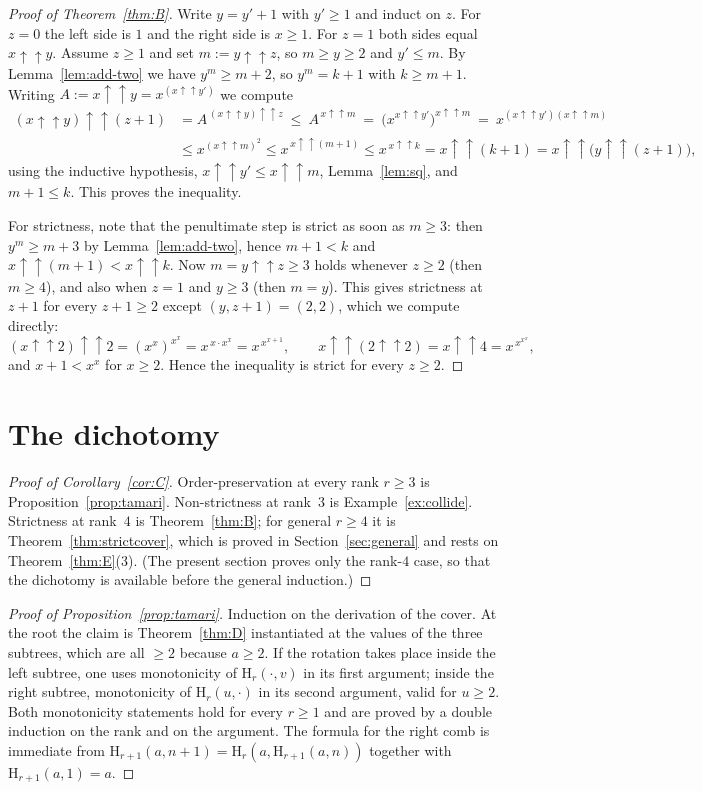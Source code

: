 \documentclass[11pt,a4paper]{article}
\theoremstyle{plain}
\theoremstyle{definition}
\newcommand{\HH}{\mathrm{H}}
\newcommand{\tw}{\uparrow\uparrow}
\begin{document}
\begin{proof}[Proof of Theorem~\ref{thm:B}]
Write $y=y'+1$ with $y'\ge1$ and induct on $z$.
For $z=0$ the left side is $1$ and the right side is $x\ge1$.
For $z=1$ both sides equal $x\tw y$.
Assume $z\ge1$ and set $m:=y\tw z$, so $m\ge y\ge2$ and $y'\le m$.
By Lemma~\ref{lem:add-two} we have $y^{m}\ge m+2$, so $y^{m}=k+1$ with $k\ge m+1$.
Writing $A:=x\tw y=x^{(x\tw y')}$ we compute
\begin{align*}
  (x\tw y)\tw(z+1)
  &= A^{\,(x\tw y)\tw z}
   \ \le\ A^{\,x\tw m}
   \ =\ \bigl(x^{x\tw y'}\bigr)^{x\tw m}
   \ =\ x^{(x\tw y')(x\tw m)}\\
  &\le x^{(x\tw m)^{2}}
   \le x^{\,x\tw(m+1)}
   \le x^{\,x\tw k}
   = x\tw(k+1)
   = x\tw\bigl(y\tw(z+1)\bigr),
\end{align*}
using the inductive hypothesis, $x\tw y'\le x\tw m$, Lemma~\ref{lem:sq}, and
$m+1\le k$. This proves the inequality.

For strictness, note that the penultimate step is strict as soon as $m\ge3$: then
$y^{m}\ge m+3$ by Lemma~\ref{lem:add-two}, hence $m+1<k$ and $x\tw(m+1)<x\tw k$.
Now $m=y\tw z\ge3$ holds whenever $z\ge2$ (then $m\ge4$), and also when $z=1$ and
$y\ge3$ (then $m=y$). This gives strictness at $z+1$ for every $z+1\ge2$ except
$(y,z+1)=(2,2)$, which we compute directly:
\[
  (x\tw2)\tw2=(x^{x})^{x^{x}}=x^{\,x\cdot x^{x}}=x^{\,x^{x+1}},
  \qquad
  x\tw(2\tw2)=x\tw4=x^{\,x^{x^{x}}},
\]
and $x+1<x^{x}$ for $x\ge2$. Hence the inequality is strict for every $z\ge2$.
\end{proof}
\section{The dichotomy}\label{sec:dicho}

\begin{proof}[Proof of Corollary~\ref{cor:C}]
Order-preservation at every rank $r\ge3$ is Proposition~\ref{prop:tamari}.
Non-strictness at rank~$3$ is Example~\ref{ex:collide}. Strictness at rank~$4$ is
Theorem~\ref{thm:B}; for general $r\ge4$ it is Theorem~\ref{thm:strictcover},
which is proved in Section~\ref{sec:general} and rests on
Theorem~\ref{thm:E}(3). (The present section proves only the rank-$4$ case, so that
the dichotomy is available before the general induction.)
\end{proof}

\begin{proof}[Proof of Proposition~\ref{prop:tamari}]
Induction on the derivation of the cover. At the root the claim is
Theorem~\ref{thm:D} instantiated at the values of the three subtrees, which are all
$\ge2$ because $a\ge2$. If the rotation takes place inside the left subtree, one uses
monotonicity of $\HH_r(\cdot,v)$ in its first argument; inside the right subtree,
monotonicity of $\HH_r(u,\cdot)$ in its second argument, valid for $u\ge2$. Both
monotonicity statements hold for every $r\ge1$ and are proved by a double induction
on the rank and on the argument. The formula for the right comb is immediate from
$\HH_{r+1}(a,n+1)=\HH_r(a,\HH_{r+1}(a,n))$ together with $\HH_{r+1}(a,1)=a$.
\end{proof}
\end{document}
